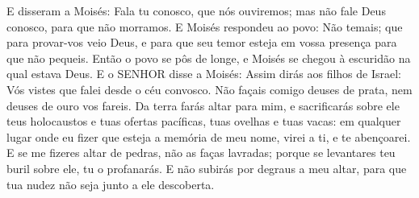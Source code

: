 {E disseram a Moisés: Fala tu conosco, que nós ouviremos; mas não fale Deus conosco, para que não morramos.
E Moisés respondeu ao povo: Não temais; que para provar-vos veio Deus, e para que seu temor esteja em vossa presença para que não pequeis.
Então o povo se pôs de longe, e Moisés se chegou à escuridão na qual estava Deus.
E o SENHOR disse a Moisés: Assim dirás aos filhos de Israel: Vós vistes que falei desde o céu convosco.
Não façais comigo deuses de prata, nem deuses de ouro vos fareis.
Da terra farás altar para mim, e sacrificarás sobre ele teus holocaustos e tuas ofertas pacíficas, tuas ovelhas e tuas vacas: em qualquer lugar onde eu fizer que esteja a memória de meu nome, virei a ti, e te abençoarei.
E se me fizeres altar de pedras, não as faças lavradas; porque se levantares teu buril sobre ele, tu o profanarás.
E não subirás por degraus a meu altar, para que tua nudez não seja junto a ele descoberta.

}
